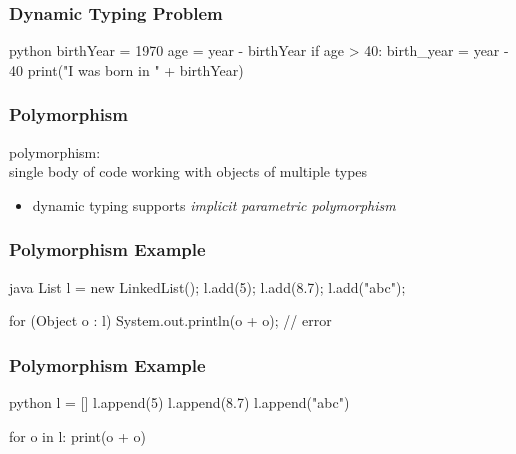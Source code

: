 \documentclass[dvipsnames]{beamer}
\theoremstyle{plain}
\begin{document}
\begin{frame}[fragile]
  \frametitle{Dynamic Typing Problem}

  \begin{example}[Python]
    \begin{pygments}{python}
birthYear = 1970
age = year - birthYear
if age > 40:
    birth_year = year - 40
print("I was born in " + birthYear)
    \end{pygments}
  \end{example}
\end{frame}

\begin{frame}
  \frametitle{Polymorphism}

  \begin{definition}
    \alert{polymorphism}:\\
      single body of code working with objects of multiple types
  \end{definition}

  \begin{itemize}
    \item dynamic typing supports \emph{implicit parametric polymorphism}
  \end{itemize}
\end{frame}

\begin{frame}[fragile]
  \frametitle{Polymorphism Example}

  \begin{example}
    \begin{pygments}{java}
List l = new LinkedList();
l.add(5);
l.add(8.7);
l.add("abc");

for (Object o : l)
  System.out.println(o + o);    // error
    \end{pygments}
  \end{example}
\end{frame}

\begin{frame}[fragile]
  \frametitle{Polymorphism Example}

  \begin{example}
    \begin{pygments}{python}
l = []
l.append(5)
l.append(8.7)
l.append("abc")

for o in l:
  print(o + o)
    \end{pygments}
  \end{example}
\end{frame}
\end{document}
